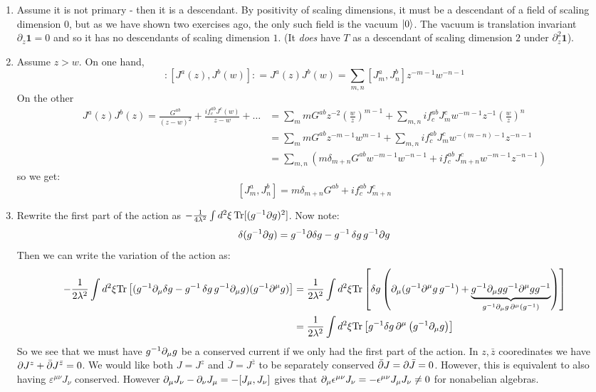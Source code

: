 \documentclass[11pt]{article}
\begin{document}
\begin{enumerate}
	\item Assume it is not primary - then it is a descendant. By positivity of scaling dimensions, it must be a descendant of a field of scaling dimension $0$, but as we have shown two exercises ago, the only such field is the vacuum $\ket 0$. The vacuum is translation invariant $\partial_z \mathbf{1} = 0$ and so it has no descendants of scaling dimension $1$. (It \emph{does} have $T$ as a descendant of scaling dimension $2$ under $\partial_z^2 \mathbf{1}$).
	
	\item Assume $z > w$. On one hand, 
	\[
		:[J^a(z), J^b(w)]: = J^a(z) J^b(w) = \sum_{m, n} [J_m^a, J_n^b] z^{-m-1} w^{-n-1}
	\]
	On the other 
	\[
		\begin{aligned}
		J^a(z) J^b(z) = \frac{G^{ab}}{(z-w)^2} + \frac{i f^{ab}_c J^c(w)}{z-w} + \dots 
		&= \sum_{m} m G^{ab} z^{-2} \left(\frac{w}{z}\right)^{m-1} + \sum_{m,n} i f^{ab}_c J^c_m w^{-m-1} z^{-1} \left( \frac{w}{z} \right)^n\\
		&= \sum_m m G^{ab} z^{-m-1} w^{m-1} + \sum_{m,n} i f^{ab}_c J^c_m w^{-(m-n)-1} z^{-n-1}\\
		&= \sum_{m, n} \left(m \delta_{m+n} G^{ab} w^{-m-1} w^{-n-1} + i f^{ab}_c J^c_{m+n} w^{-m-1} z^{-n-1} \right)
		\end{aligned}
	\]
	so we get:
	\[
		[J^a_m, J^b_n] = m \delta_{m+n} G^{ab} + i f^{ab}_c J^c_{m+n}
	\]
	\item Rewrite the first part of the action as $-\frac{1}{4\lambda^2} \int d^2 \xi\, \mathrm{Tr}[(g^{-1} \partial g)^2]$. Now note:
	\[
		\delta(g^{-1} \partial g) = g^{-1} \partial \delta g - g^{-1}\, \delta g\, g^{-1} \partial g
	\]
	Then we can write the variation of the action as:
	\[
	\begin{aligned}
				- \frac{1}{2 \lambda^2} \int d^2 \xi \mathrm{Tr} \left[ (g^{-1} \partial_\mu \delta g - g^{-1}\, \delta g\, g^{-1} \partial_\mu g) (g^{-1} \partial^\mu g) \right]
				&=  \frac{1}{2 \lambda^2} \int d^2 \xi \mathrm{Tr} \left[ \delta g \left(\partial_\mu(g^{-1} \partial^\mu g\, g^{-1}) + \underbrace{g^{-1} \partial_\mu g g^{-1} \partial^\mu g g^{-1}}_{g^{-1} \partial_\mu g\, \partial^\mu(g^{-1})}\right) \right]\\
		&= \frac{1}{2 \lambda^2} \int d^2 \xi \mathrm{Tr} \left[ g^{-1} \delta g \, \partial^\mu \left(g^{-1} \partial_\mu g \right) \right]		
	\end{aligned}
	\]
	So we see that we must have $g^{-1} \partial_\mu g$ be a conserved current if we only had the first part of the action. In $z, \bar z$ cooredinates we have $\partial J^z + \bar {\partial} J^{\bar z} = 0$. We would like both $J = J^z$ and $\bar J = J^{\bar z}$ to be separately conserved $\bar {\partial} J = \partial \bar J = 0$. However, this is equivalent to also having $\varepsilon^{\mu \nu} J_\nu$ conserved. However $\partial_\mu J_\nu - \partial_\nu J_\mu = -[J_\mu, J_\nu]$ gives that $\partial_\mu \epsilon^{\mu \nu} J_\nu = - \epsilon^{\mu \nu} J_\mu J_\nu \neq 0$ for nonabelian algebras. 
	

\end{enumerate}
\end{document}
